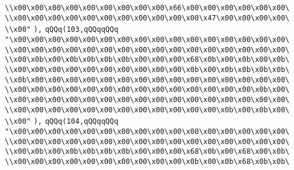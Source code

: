 \verb|\\x00\x00\x00\x00\x00\x00\x00\x00\x00\x66\x00\x00\x00\x00\x00\x00\|\newline
\verb|\\x00\x00\x00\x00\x00\x00\x00\x00\x00\x00\x00\x47\x00\x00\x00\x00\|\newline
\verb|\\x00"|\newline
\verb|),|\newline
\verb|qQQq(103,qQQqqQQq|\newline
\verb|"\x00\x00\x00\x00\x00\x00\x00\x00\x00\x00\x00\x00\x00\x00\x00\x00\|\newline
\verb|\\x00\x00\x00\x00\x00\x00\x00\x00\x00\x00\x00\x00\x00\x00\x00\x00\|\newline
\verb|\\x00\x0b\x00\x0b\x0b\x0b\x0b\x00\x00\x00\x68\x0b\x00\x0b\x00\x0b\|\newline
\verb|\\x00\x00\x00\x00\x00\x00\x00\x00\x00\x00\x0b\x00\x0b\x0b\x0b\x0b\|\newline
\verb|\\x0b\x00\x00\x00\x00\x00\x00\x00\x00\x00\x00\x00\x00\x00\x00\x00\|\newline
\verb|\\x00\x00\x00\x00\x00\x00\x00\x00\x00\x00\x00\x00\x00\x00\x0b\x00\|\newline
\verb|\\x00\x00\x00\x00\x00\x00\x00\x00\x00\x00\x00\x00\x00\x00\x00\x00\|\newline
\verb|\\x00\x00\x00\x00\x00\x00\x00\x00\x00\x00\x00\x00\x0b\x00\x0b\x00\|\newline
\verb|\\x00"|\newline
\verb|),|\newline
\verb|qQQq(104,qQQqqQQq|\newline
\verb|"\x00\x00\x00\x00\x00\x00\x00\x00\x00\x00\x00\x00\x00\x00\x00\x00\|\newline
\verb|\\x00\x00\x00\x00\x00\x00\x00\x00\x00\x00\x00\x00\x00\x00\x00\x00\|\newline
\verb|\\x00\x0b\x00\x0b\x0b\x0b\x0b\x00\x00\x00\x68\x0b\x00\x68\x00\x0b\|\newline
\verb|\\x00\x00\x00\x00\x00\x00\x00\x00\x00\x00\x0b\x00\x0b\x68\x0b\x0b\|\newline
